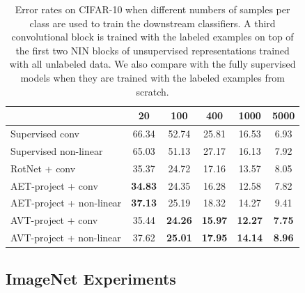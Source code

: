\documentclass[10pt,journal,compsoc,twoside]{IEEEtran}
\begin{document}
\begin{table}
\caption{Error rates on CIFAR-10 when different numbers of samples per class are used to train the downstream classifiers. A third convolutional block is trained with the labeled examples on top of the first two NIN blocks of unsupervised representations trained with all unlabeled data. We also compare with the fully supervised models when they are trained with the labeled examples from scratch.}\label{tab03}
\centering
 \begin{tabular}{l|ccccc} \toprule
   &20&100&400&1000&5000\\ \midrule
Supervised conv &66.34&52.74 &25.81 &16.53 &6.93\\
Supervised non-linear &65.03&51.13 &27.17 &16.13 &7.92\\
RotNet + conv \cite{gidaris2018unsupervised}&35.37 &24.72&17.16&13.57 &8.05 \\\midrule
AET-project + conv  &\bf 34.83&24.35 &16.28 &12.58 &7.82 \\
AET-project + non-linear  &\bf 37.13&25.19&18.32 & 14.27 &9.41 \\
\midrule
AVT-project + conv &35.44&\textbf{24.26} &\textbf{15.97} &\textbf{12.27} &\textbf{7.75}\\
AVT-project + non-linear &37.62&\textbf{25.01} &\textbf{17.95} &\textbf{14.14} &\textbf{8.96}\\\bottomrule
\end{tabular}
\end{table}




\subsection{ImageNet Experiments}
\end{document}
